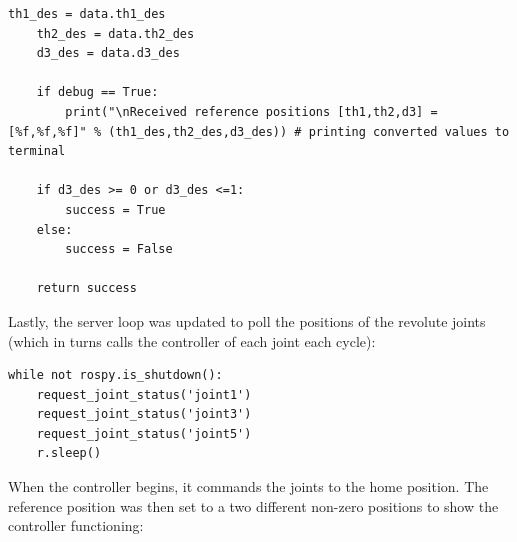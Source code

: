 \documentclass[10pt]{article}
\begin{document}
\begin{enumerate}
\begin{lstlisting}[style=Matlab-editor,basicstyle=\mlttfamily,escapechar=`]
	th1_des = data.th1_des
	th2_des = data.th2_des
	d3_des = data.d3_des
	
	if debug == True:
		print("\nReceived reference positions [th1,th2,d3] = [%f,%f,%f]" % (th1_des,th2_des,d3_des)) # printing converted values to terminal
	
	if d3_des >= 0 or d3_des <=1:
		success = True
	else:
		success = False
	
	return success
\end{lstlisting}	

	Lastly, the server loop was updated to poll the positions of the revolute joints (which in turns calls the controller of each joint each cycle):
	
\begin{lstlisting}[style=Matlab-editor,basicstyle=\mlttfamily,escapechar=`]
while not rospy.is_shutdown():
	request_joint_status('joint1')
	request_joint_status('joint3')
	request_joint_status('joint5')
	r.sleep()
\end{lstlisting}	


	When the controller begins, it commands the joints to the home position. The reference position was then set to a two different non-zero positions to show the controller functioning:
	

\end{enumerate}
\end{document}
